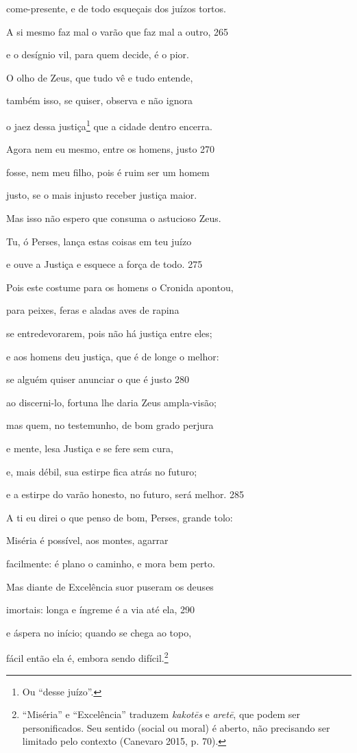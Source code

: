 come-presente, e de todo esqueçais dos juízos tortos.

A si mesmo faz mal o varão que faz mal a outro, \num{265}

e o desígnio vil, para quem decide, é o pior.

O olho de Zeus, que tudo vê e tudo entende,

também isso, se quiser, observa e não ignora

o jaez dessa justiça\footnote{Ou ``desse juízo''.} que a cidade dentro encerra.

Agora nem eu mesmo, entre os homens, justo \num{270}

fosse, nem meu filho, pois é ruim ser um homem

justo, se o mais injusto receber justiça maior.

Mas isso não espero que consuma o astucioso Zeus.

Tu, ó Perses, lança estas coisas em teu juízo

e ouve a Justiça e esquece a força de todo. \num{275}

Pois este costume para os homens o Cronida apontou,

para peixes, feras e aladas aves de rapina

se entredevorarem, pois não há justiça entre eles;

e aos homens deu justiça, que é de longe o melhor:

se alguém quiser anunciar o que é justo \num{280}

ao discerni-lo, fortuna lhe daria Zeus ampla-visão;

mas quem, no testemunho, de bom grado perjura

e mente, lesa Justiça e se fere sem cura,

e, mais débil, sua estirpe fica atrás no futuro;

e a estirpe do varão honesto, no futuro, será melhor. \num{285}

A ti eu direi o que penso de bom, Perses, grande tolo:

Miséria é possível, aos montes, agarrar

facilmente: é plano o caminho, e mora bem perto.

Mas diante de Excelência suor puseram os deuses

imortais: longa e íngreme é a via até ela, \num{290}

e áspera no início; quando se chega ao topo,

fácil então ela é, embora sendo difícil.\footnote{``Miséria'' e ``Excelência'' traduzem \emph{kakotēs} e
\emph{aretē}, que podem ser personificados. Seu sentido (social ou
moral) é aberto, não precisando ser limitado pelo contexto (Canevaro
2015, p. 70).}

